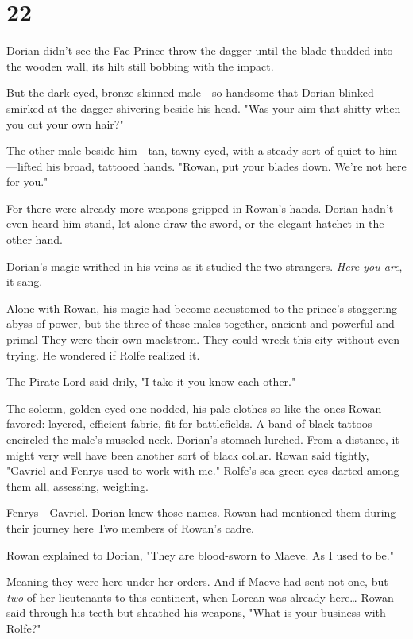 
\chapter{22}

Dorian didn't see the Fae Prince throw the dagger until the blade thudded into the wooden wall, its hilt still bobbing with the impact.

But the dark-eyed, bronze-skinned male---so handsome that Dorian blinked ---smirked at the dagger shivering beside his head. "Was your aim that shitty when you cut your own hair?"

The other male beside him---tan, tawny-eyed, with a steady sort of quiet to him---lifted his broad, tattooed hands. "Rowan, put your blades down. We're not here for you."

For there were already more weapons gripped in Rowan's hands. Dorian hadn't even heard him stand, let alone draw the sword, or the elegant hatchet in the other hand.

Dorian's magic writhed in his veins as it studied the two strangers.
\emph{Here you are}, it sang.

Alone with Rowan, his magic had become accustomed to the prince's staggering abyss of power, but the three of these males together, ancient and powerful and primal  They were their own maelstrom. They could wreck this city without even trying. He wondered if Rolfe realized it.

The Pirate Lord said drily, "I take it you know each other."

The solemn, golden-eyed one nodded, his pale clothes so like the ones Rowan favored: layered, efficient fabric, fit for battlefields. A band of black tattoos encircled the male's muscled neck. Dorian's stomach lurched. From a distance, it might very well have been another sort of black collar. Rowan said tightly, "Gavriel and Fenrys used to 
work with me." Rolfe's sea-green eyes darted among them all, assessing, weighing.

Fenrys---Gavriel. Dorian knew those names. Rowan had mentioned them during their journey here  Two members of Rowan's cadre.

Rowan explained to Dorian, "They are blood-sworn to Maeve. As I used to be."

Meaning they were here under her orders. And if Maeve had sent not one, but \emph{two} of her lieutenants to this continent, when Lorcan was already here\ldots{} Rowan said through his teeth but sheathed his weapons, "What is your business with Rolfe?"

